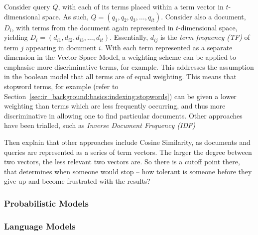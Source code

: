 Consider query $Q$, with each of its terms placed within a term vector in $t$-dimensional space. As such, $Q = (q_1, q_2, q_3,\dotsc, q_{it})$. Consider also a document, $D_i$, with terms from the document again represented in $t$-dimensional space, yielding $D_i = (d_{i1}, d_{i2}, d_{i3},\dotsc, d_{it})$. Essentially, $d_{ij}$ is the \emph{term frequency (TF)} of term $j$ appearing in document $i$. With each term represented as a separate dimension in the Vector Space Model, a weighting scheme can be applied to emphasise more discriminative terms, for example. This addresses the assumption in the boolean model that all terms are of equal weighting. This means that stopword terms, for example (refer to Section~\ref{sec:ir_background:basics:indexing:stopwords}) can be given a lower weighting than terms which are less frequently occurring, and thus more discriminative in allowing one to find particular documents. Other approaches have been trialled, such as \emph{Inverse Document Frequency (IDF)}

Then explain that other approaches include Cosine Similarity, as documents and queries are represented as a series of term vectors. The larger the degree between two vectors, the less relevant two vectors are. So there is a cutoff point there, that determines when someone would stop -- how tolerant is someone before they give up and become frustrated with the results?

\subsubsection{Probabilistic Models}

\subsubsection{Language Models}

%
%
%

